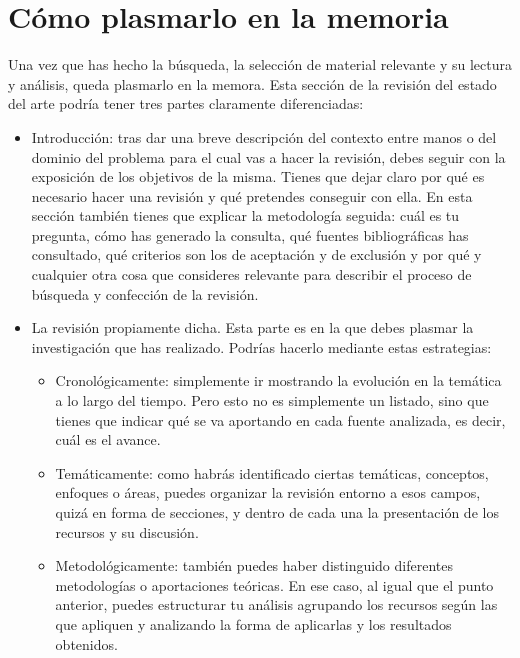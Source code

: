 \section{Cómo plasmarlo en la memoria}

Una vez que has hecho la búsqueda, la selección de material relevante y su lectura y análisis, queda plasmarlo en la memora. Esta sección de la revisión del estado del arte podría tener tres partes claramente diferenciadas:

\begin{itemize}
    \item Introducción: tras dar una breve descripción del contexto entre manos o del dominio del problema para el cual vas a hacer la revisión, debes seguir con la exposición de los objetivos de la misma.  Tienes que dejar claro por qué es necesario hacer una revisión y qué pretendes conseguir con ella. En esta sección también tienes que explicar la metodología seguida: cuál es tu pregunta, cómo has generado la consulta, qué fuentes bibliográficas has consultado, qué criterios son los de aceptación y de exclusión y por qué y cualquier otra cosa que consideres relevante para describir el proceso de búsqueda y confección de la revisión.

    \item La revisión propiamente dicha. Esta parte es en la que debes plasmar la investigación que has realizado. Podrías hacerlo mediante estas estrategias:

    \begin{itemize}
        \item Cronológicamente: simplemente ir mostrando la evolución en la temática a lo largo del tiempo. Pero esto no es simplemente un listado, sino que tienes que indicar qué se va aportando en cada fuente analizada, es decir, cuál es el avance.

        \item Temáticamente: como habrás identificado ciertas temáticas, conceptos, enfoques o áreas, puedes organizar la revisión entorno a esos campos, quizá en forma de secciones, y dentro de cada una la presentación de los recursos y su discusión.

        \item Metodológicamente: también puedes haber distinguido diferentes metodologías o aportaciones teóricas. En ese caso, al igual que el punto anterior, puedes estructurar tu análisis agrupando los recursos según las que apliquen y analizando la forma de aplicarlas y los resultados obtenidos.
    \end{itemize}
    

\end{itemize}
